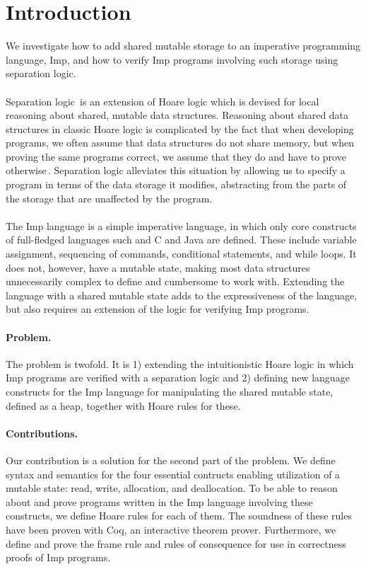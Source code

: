 \section{Introduction}
We investigate how to add shared mutable storage to an imperative programming language, Imp, and how to verify Imp programs involving such storage using separation logic.
\paragraph{}
Separation logic\,\cite{Reynolds02} is an extension of Hoare logic which is devised for local reasoning about shared, mutable data structures. Reasoning about shared data structures in classic Hoare logic is complicated by the fact that when developing programs, we often assume that data structures do not share memory, but when proving the same programs correct, we assume that they do and have to prove otherwise\,\cite{reynolds2008AnIntroductionTo}. Separation logic alleviates this situation by allowing us to specify a program in terms of the data storage it modifies, abstracting from the parts of the storage that are unaffected by the program. 
\paragraph{}
The Imp language is a simple imperative language, in which only core constructs of full-fledged languages such and C and Java are defined. These include variable assignment, sequencing of commands, conditional statements, and while loops. It does not, however, have a mutable state, making most data structures unnecessarily complex to define and cumbersome to work with. Extending the language with a shared mutable state adds to the expressiveness of the language, but also requires an extension of the logic for verifying Imp programs.

\paragraph{Problem.}
The problem is twofold. It is 1) extending the intuitionistic Hoare logic in which Imp programs are verified with a separation logic and 2) defining new language constructs for the Imp language for manipulating the shared mutable state, defined as a heap, together with Hoare rules for these.


\paragraph{Contributions.}
Our contribution is a solution for the second part of the problem. We define syntax and semantics for the four essential contructs enabling utilization of a mutable state: read, write, allocation, and deallocation. To be able to reason about and prove programs written in the Imp language involving these constructs, we define Hoare rules for each of them. The soundness of these rules have been proven with Coq, an interactive theorem prover. Furthermore, we define and prove the frame rule and rules of consequence for use in correctness proofs of Imp programs.

